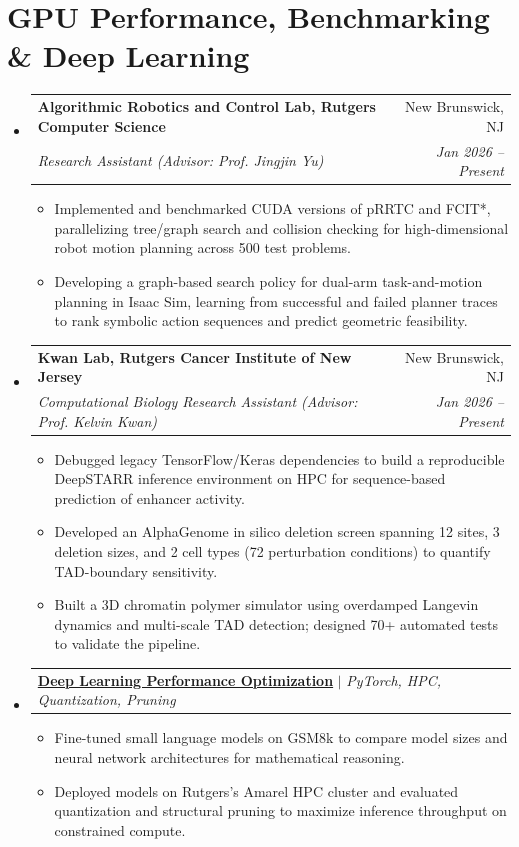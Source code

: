 \documentclass[letterpaper,11pt]{article}
\makeatletter
\newcommand{\resumeItem}[1]{
  \item\small{
    {#1 \vspace{-2pt}}
  }
}
\newcommand{\resumeSubheading}[4]{
  \vspace{-2pt}\item
    \begin{tabular*}{0.97\textwidth}[t]{l@{\extracolsep{\fill}}r}
      \textbf{#1} & #2 \\
      \textit{\small#3} & \textit{\small #4} \\
    \end{tabular*}\vspace{-7pt}
}
\newcommand{\resumeProjectHeading}[2]{
    \item
    \begin{tabular*}{0.97\textwidth}{l@{\extracolsep{\fill}}r}
      \small#1 & #2 \\
    \end{tabular*}\vspace{-7pt}
}
\newcommand{\resumeSubHeadingListStart}{\begin{itemize}[leftmargin=0.15in, label={}]}
\newcommand{\resumeSubHeadingListEnd}{\end{itemize}}
\newcommand{\resumeItemListStart}{\begin{itemize}}
\newcommand{\resumeItemListEnd}{\end{itemize}\vspace{-5pt}}
\makeatother
\begin{document}
\section{GPU Performance, Benchmarking \& Deep Learning}
  \resumeSubHeadingListStart
    \resumeSubheading
      {Algorithmic Robotics and Control Lab, Rutgers Computer Science}{New Brunswick, NJ}
      {Research Assistant (Advisor: Prof. Jingjin Yu)}{Jan 2026 -- Present}
      \resumeItemListStart
        \resumeItem{Implemented and benchmarked CUDA versions of pRRTC and FCIT*, parallelizing tree/graph search and collision checking for high-dimensional robot motion planning across 500 test problems.}
        \resumeItem{Developing a graph-based search policy for dual-arm task-and-motion planning in Isaac Sim, learning from successful and failed planner traces to rank symbolic action sequences and predict geometric feasibility.}
      \resumeItemListEnd
    \resumeSubheading
      {Kwan Lab, Rutgers Cancer Institute of New Jersey}{New Brunswick, NJ}
      {Computational Biology Research Assistant (Advisor: Prof. Kelvin Kwan)}{Jan 2026 -- Present}
      \resumeItemListStart
        \resumeItem{Debugged legacy TensorFlow/Keras dependencies to build a reproducible DeepSTARR inference environment on HPC for sequence-based prediction of enhancer activity.}
        \resumeItem{Developed an AlphaGenome in silico deletion screen spanning 12 sites, 3 deletion sizes, and 2 cell types (72 perturbation conditions) to quantify TAD-boundary sensitivity.}
        \resumeItem{Built a 3D chromatin polymer simulator using overdamped Langevin dynamics and multi-scale TAD detection; designed 70+ automated tests to validate the pipeline.}
      \resumeItemListEnd
    \resumeProjectHeading
      {\href{https://github.com/AkeBoss-tech/llm-research}{\textbf{Deep Learning Performance Optimization}} $|$ \emph{PyTorch, HPC, Quantization, Pruning}}{}
      \resumeItemListStart
        \resumeItem{Fine-tuned small language models on GSM8k to compare model sizes and neural network architectures for mathematical reasoning.}
        \resumeItem{Deployed models on Rutgers's Amarel HPC cluster and evaluated quantization and structural pruning to maximize inference throughput on constrained compute.}
      \resumeItemListEnd
  \resumeSubHeadingListEnd
\end{document}
